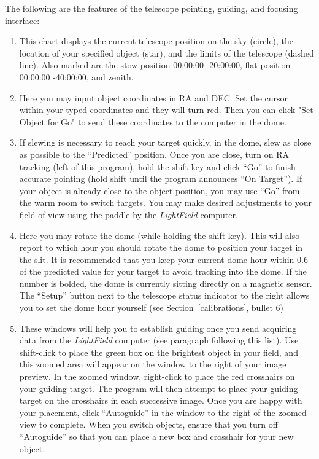 \documentclass[12pt]{article}
\begin{document}
\noindent The following are the features of the telescope pointing, guiding, and focusing interface:
\begin{enumerate}
   \item This chart displays the current telescope position on the sky (circle), the location of your specified object (star), and the limits of the telescope (dashed line). Also marked are the stow position 00:00:00 -20:00:00, flat position 00:00:00 -40:00:00, and zenith.
   \item Here you may input object coordinates in RA and DEC. Set the cursor within your typed coordinates and they will turn red. Then you can click "Set Object for Go" to send these coordinates to the computer in the dome.
   \item If slewing is necessary to reach your target quickly, in the dome, slew as close as possible to the ``Predicted'' position. Once you are close, turn on RA tracking (left of this program), hold the shift key and click ``Go'' to finish accurate pointing (hold shift until the program announces ``On Target''). If your object is already close to the object position, you may use ``Go'' from the warm room to switch targets. You may make desired adjustments to your field of view using the paddle by the \textit{LightField} computer.
   \item Here you may rotate the dome (while holding the shift key). This will also report to which hour you should rotate the dome to position your target in the slit. It is recommended that you keep your current dome hour within 0.6 of the predicted value for your target to avoid tracking into the dome. If the number is bolded, the dome is currently sitting directly on a magnetic sensor. The ``Setup'' button next to the telescope status indicator to the right allows you to set the dome hour yourself (see Section~\ref{calibrations}, bullet 6)
   \item These windows will help you to establish guiding once you send acquiring data from the \textit{LightField} computer (see paragraph following this list). Use shift-click to place the green box on the brightest object in your field, and this zoomed area will appear on the window to the right of your image preview. In the zoomed window, right-click to place the red crosshairs on your guiding target. The program will then attempt to place your guiding target on the crosshairs in each successive image. Once you are happy with your placement, click ``Autoguide'' in the window to the right of the zoomed view to complete. When you switch objects, ensure that you turn off ``Autoguide'' so that you can place a new box and crosshair for your new object.

\end{enumerate}
\end{document}
